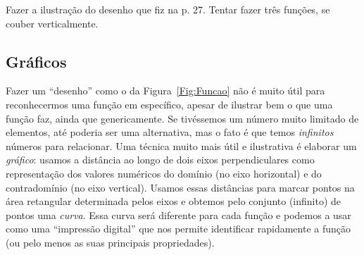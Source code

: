 \begin{marginfigure}
\centering
{}
\caption{Fazer a ilustração do desenho que fiz na p. 27. Tentar fazer três funções, se couber verticalmente.}
\end{marginfigure}

\subsection{Gráficos}

Fazer um ``desenho'' como o da Figura~\ref{Fig:Funcao} não é muito útil para reconhecermos uma função em específico, apesar de ilustrar bem o que uma função faz, ainda que genericamente. Se tivéssemos um número muito limitado de elementos, até poderia ser uma alternativa, mas o fato é que temos \emph{infinitos} números para relacionar. Uma técnica muito mais útil e ilustrativa é elaborar um \emph{gráfico}: usamos a distância ao longo de dois eixos perpendiculares como representação dos valores numéricos do domínio (no eixo horizontal) e do contradomínio (no eixo vertical). Usamos essas distâncias para marcar pontos na área retangular determinada pelos eixos e obtemos pelo conjunto (infinito) de pontos uma \emph{curva}. Essa curva será diferente para cada função e podemos a usar como uma ``impressão digital'' que nos permite identificar rapidamente a função (ou pelo menos as suas principais propriedades).

